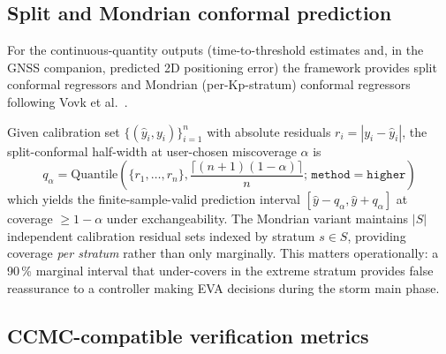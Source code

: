 \documentclass[11pt,letterpaper]{article}
\begin{document}
\subsection{Split and Mondrian conformal prediction}
\label{sec:methods:conformal}

For the continuous-quantity outputs (time-to-threshold estimates and, in the
GNSS companion, predicted 2D positioning error) the framework provides
split conformal regressors and Mondrian (per-Kp-stratum) conformal regressors
following Vovk et al.\ \cite{vovk2005,vovk2022}.

Given calibration set
$\{(\hat{y}_i, y_i)\}_{i=1}^{n}$ with absolute residuals $r_i = |y_i - \hat{y}_i|$,
the split-conformal half-width at user-chosen miscoverage $\alpha$ is
\begin{equation}
  q_\alpha = \mathrm{Quantile}\left(\{r_1,\ldots,r_n\},
    \frac{\lceil (n+1)(1-\alpha) \rceil}{n};\,
    \texttt{method}=\texttt{higher}\right)
  \label{eq:conformal-q}
\end{equation}
which yields the finite-sample-valid prediction interval
$[\hat{y} - q_\alpha, \hat{y} + q_\alpha]$ at coverage $\ge 1-\alpha$
under exchangeability.  The Mondrian variant maintains $|S|$ independent
calibration residual sets indexed by stratum $s \in S$, providing coverage
\emph{per stratum} rather than only marginally.  This matters operationally:
a 90\,\% marginal interval that under-covers in the extreme stratum
provides false reassurance to a controller making EVA decisions during the
storm main phase.

\subsection{CCMC-compatible verification metrics}
\label{sec:methods:metrics}
\end{document}
